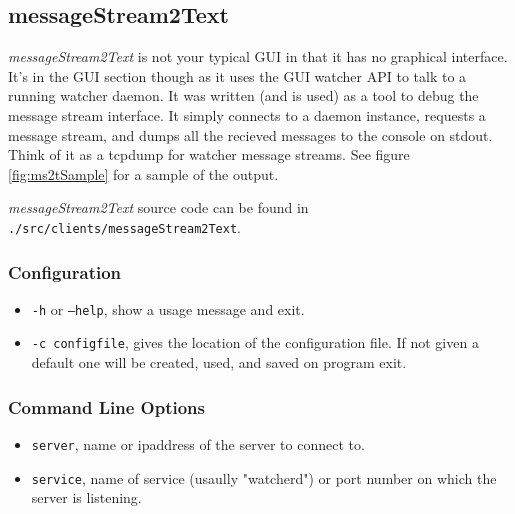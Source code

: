 \subsection{messageStream2Text}

{\it messageStream2Text} is not your typical GUI in that it has no graphical interface. It's in the GUI section though as it uses 
the GUI watcher API to talk to a running watcher daemon. It was written (and is used) as a tool to debug the message stream interface. It simply
connects to a daemon instance, requests a message stream, and dumps all the recieved messages to the console on stdout. Think of it as a 
tcpdump for watcher message streams. See figure \ref{fig:ms2tSample} for a sample of the output.

{\it messageStream2Text} source code can be found in {\tt .\slash src\slash clients\slash messageStream2Text}. 

\subsubsection{Configuration}

\begin{itemize}
\item {\tt -h} or {\tt --help}, show a usage message and exit. 
\item {\tt -c configfile}, gives the location of the configuration file. If not given a default one will be created, used, and saved on program exit.
\end{itemize}

\subsubsection{Command Line Options}

\begin{itemize}
\item {\tt server}, name or ipaddress of the server to connect to.
\item {\tt service}, name of service (usaully "watcherd") or port number on which the server is listening.
\end{itemize}

